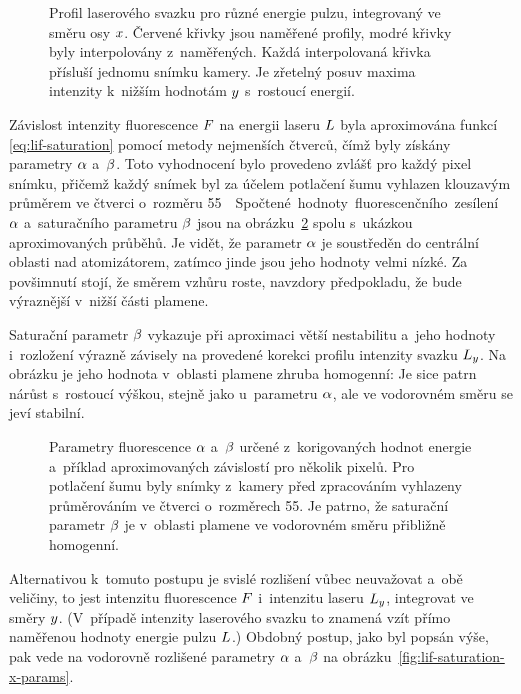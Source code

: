 \begin{figure}[htp]
	\centering
	
	\caption{Profil laserového svazku pro různé energie pulzu,
		integrovaný ve směru osy $x$.
		Červené křivky jsou naměřené profily,
		modré křivky byly interpolovány z~naměřených.
		Každá interpolovaná křivka přísluší jednomu snímku kamery.
		Je zřetelný posuv maxima intenzity k~nižším hodnotám $y$
		s~rostoucí energií.}
	\label{fig:lif-saturation-full-profile}
\end{figure}

Závislost intenzity fluorescence $F$ na energii laseru $L$
byla aproximována funkcí \eqref{eq:lif-saturation} pomocí metody
nejmenších čtverců, čímž byly získány parametry $\alpha$ a~$\beta$.
Toto vyhodnocení bylo provedeno zvlášť pro každý pixel snímku,
přičemž každý snímek byl za účelem potlačení šumu vyhlazen klouzavým
průměrem ve čtverci o~rozměru \num{5}\times\SI{5}\pixel.

Spočtené hodnoty fluorescenčního zesílení $\alpha$ a~saturačního
parametru $\beta$ jsou na obrázku~\ref{fig:lif-saturation-full-params}
spolu s~ukázkou aproximovaných průběhů.
Je vidět, že parametr $\alpha$ je soustředěn do centrální oblasti
nad atomizátorem, zatímco jinde jsou jeho hodnoty velmi nízké.
Za povšimnutí stojí, že směrem vzhůru roste, navzdory předpokladu,
že bude výraznější v~nižší části plamene.

Saturační parametr $\beta$ vykazuje při aproximaci větší nestabilitu
a~jeho hodnoty i~rozložení výrazně závisely na provedené korekci profilu
intenzity svazku $L_y$.
Na obrázku je jeho hodnota v~oblasti plamene zhruba homogenní:
Je sice patrn nárůst s~rostoucí výškou, stejně jako u~parametru $\alpha$,
ale ve vodorovném směru se jeví stabilní.

\begin{figure}
	\centering
	\small
	
	\caption{Parametry fluorescence $\alpha$ a~$\beta$
		určené z~korigovaných hodnot energie
		a~příklad aproximovaných závislostí pro několik pixelů.
		Pro potlačení šumu byly snímky z~kamery před zpracováním vyhlazeny
		průměrováním ve čtverci o~rozměrech \num{5}\times\SI{5}{\pixel}.
		Je patrno, že saturační parametr $\beta$ je
		v~oblasti plamene ve vodorovném směru přibližně homogenní.}
	\label{fig:lif-saturation-full-params}
\end{figure}

Alternativou k~tomuto postupu je svislé rozlišení vůbec neuvažovat
a~obě veličiny, to jest intenzitu fluorescence $F$ i~intenzitu
laseru $L_y$, integrovat ve směry $y$.
(V~případě intenzity laserového svazku to znamená vzít přímo
naměřenou hodnoty energie pulzu $L$.)
Obdobný postup, jako byl popsán výše, pak vede na vodorovně rozlišené
parametry $\alpha$ a~$\beta$ na obrázku~\ref{fig:lif-saturation-x-params}.

